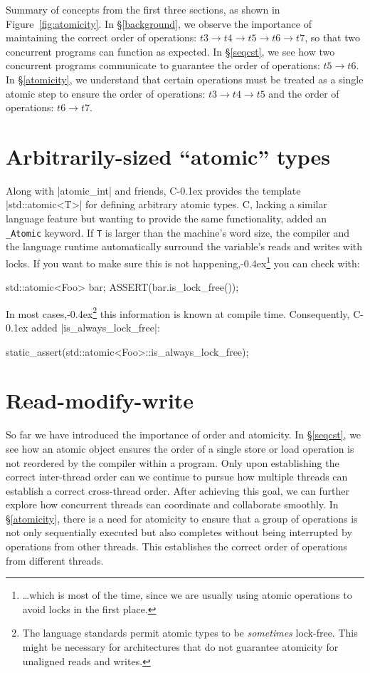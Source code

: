 \documentclass[fontsize=10pt, oneside]{scrartcl}
\newcommand{\punckern}{\kern-0.4ex}
\newcommand{\monobox}[1]{\mbox{\texttt{#1}}}
\newcommand{\keyword}[1]{\monobox{\color{darkGreen}#1}}
\newcommand{\cplusplus}[1]{C\kern-0.1ex\raisebox{0.15ex}{\texttt{++}}}
\newcommand{\clang}[1]{C}
\newcommand{\fig}[1]{Figure~\ref{#1}}
\newcommand{\secref}[1]{\hyperref[#1]{\textsc{\S}\ref*{#1}}}
\begin{document}
Summary of concepts from the first three sections, as shown in \fig{fig:atomicity}.
In \secref{background}, we observe the importance of maintaining the correct order of operations: $t3 \to t4 \to t5 \to t6 \to t7$, so that two concurrent programs can function as expected.
In \secref{seqcst}, we see how two concurrent programs communicate to guarantee the order of operations: $t5 \to t6$.
In \secref{atomicity}, we understand that certain operations must be treated as a single atomic step to ensure the order of operations: $t3 \to t4 \to t5$ and the order of operations: $t6 \to t7$.

\section{Arbitrarily-sized ``atomic'' types}
\label{atomictype}
Along with \cc|atomic_int| and friends,
\cplusplus{} provides the template \cpp|std::atomic<T>| for defining arbitrary atomic types.
\clang{}, lacking a similar language feature but wanting to provide the same functionality,
added an \keyword{\_Atomic} keyword.
If \texttt{T} is larger than the machine's word size,
the compiler and the language runtime automatically surround the variable's reads and writes with locks.
If you want to make sure this is not happening,\punckern\footnote{%
\ldots which is most of the time,
since we are usually using atomic operations to avoid locks in the first place.}
you can check with:
\begin{cppcode}
std::atomic<Foo> bar;
ASSERT(bar.is_lock_free());
\end{cppcode}
In most cases,\punckern\footnote{%
The language standards permit atomic types to be \emph{sometimes} lock-free.
This might be necessary for architectures that do not guarantee atomicity for unaligned reads and writes.}
this information is known at compile time.
Consequently, \cplusplus{17} added \cpp|is_always_lock_free|:
\begin{cppcode}
static_assert(std::atomic<Foo>::is_always_lock_free);
\end{cppcode}

\section{Read-modify-write}
\label{rmw}

So far we have introduced the importance of order and atomicity.
In \secref{seqcst}, we see how an atomic object ensures the order of a single store or load operation is not reordered by the compiler within a program. 
Only upon establishing the correct inter-thread order can we continue to pursue how multiple threads can establish a correct cross-thread order. 
After achieving this goal, we can further explore how concurrent threads can coordinate and collaborate smoothly.
In \secref{atomicity}, there is a need for atomicity to ensure that a group of operations is not only sequentially executed but also completes without being interrupted by operations from other threads.
This establishes the correct order of operations from different threads.
\end{document}
